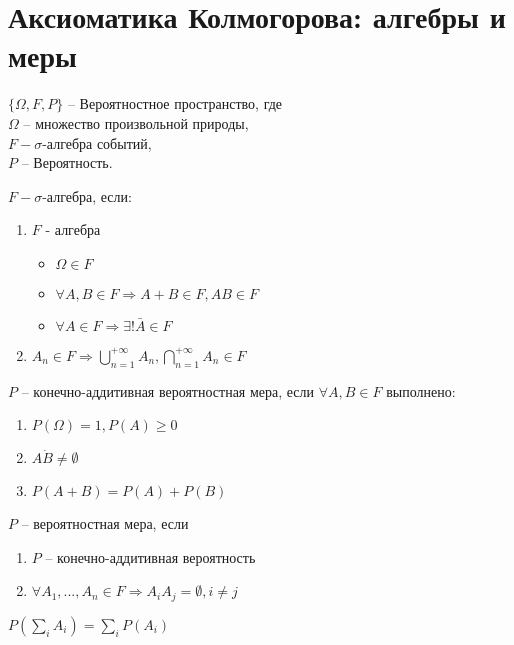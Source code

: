 \section{Аксиоматика Колмогорова: алгебры и меры}
$\{\Omega, F, P\}$ -- Вероятностное пространство, где\\
$\Omega$ -- множество произвольной природы,\\
$F - \sigma$-алгебра событий,\\
$P$ -- Вероятность.
\begin{definition}
 $F - \sigma$-алгебра, если:
 \begin{enumerate}
  \item $F$ - алгебра
   \begin{itemize}
    \item $\Omega \in F$
    \item $\forall A,B \in F \Rightarrow A+B \in F, AB \in F$
    \item $\forall A \in F \Rightarrow \exists ! \bar{A} \in F$
   \end{itemize}
  \item $A_n \in F \Rightarrow \bigcup\limits_{n=1}^{+\infty} A_n, \bigcap\limits_{n=1}^{+\infty} A_n \in F$
 \end{enumerate}
\end{definition}
\begin{definition}
 $P$ -- конечно-аддитивная вероятностная мера, если $\forall A,B \in F$ выполнено:
 \begin{enumerate}
  \item $P(\Omega) = 1, P(A) \geq 0$
  \item $A\dot B \ne \emptyset$
  \item $P(A+B) = P(A) + P(B)$
 \end{enumerate}
\end{definition}
\begin{definition}
 $P$ -- вероятностная мера, если
 \begin{enumerate}
  \item $P$ -- конечно-аддитивная вероятность
  \item $\forall A_1,...,A_n \in F \Rightarrow A_i A_j = \emptyset, i \ne j$
 \end{enumerate}
\end{definition}
\begin{definition}
$P(\sum\limits_i A_i) = \sum\limits_i P(A_i)$
\end{definition}
